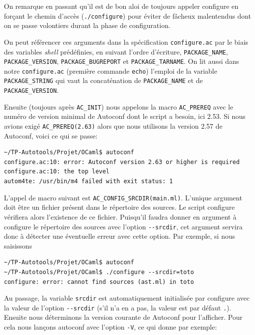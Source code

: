 \documentclass[11pt,a4paper]{article}
\begin{document}
\noindent On remarque en passant qu'il est de bon aloi de toujours
appeler \textsf{configure} en forçant le chemin d'accès
(\texttt{./configure}) pour éviter de fâcheux malentendus dont on se
passe volontiers durant la phase de configuration.

\medskip

\noindent On peut référencer ces arguments dans la spécification
\texttt{configure.ac} par le biais des variables \emph{shell}
prédéfinies, en suivant l'ordre d'écriture, \texttt{PACKAGE\_\-NAME},
\texttt{PACKAGE\_VERSION}, \texttt{PACKAGE\_BUGREPORT} et
\texttt{PACKAGE\_TARNAME}. On lit aussi dans notre
\texttt{configure.ac} (première commande \texttt{echo}) l'emploi de la
variable \texttt{PACKAGE\_STRING} qui vaut la concaténation de
\texttt{PACKAGE\_NAME} et de \texttt{PACKAGE\_\-VERS\-ION}.

\medskip

\noindent Ensuite (toujours après \texttt{AC\_INIT}) nous appelons la
macro \texttt{AC\_PREREQ} avec le numéro de version minimal de
\textsf{Autoconf} dont le script a besoin, ici \textsf{2.53}. Si nous
avions exigé \texttt{AC\_PREREQ(2.63)} alors que nous utilisons la
version \textsf{2.57} de \textsf{Autoconf}, voici ce qui se passe:
{\small
\begin{verbatim}
~/TP-Autotools/Projet/OCaml$ autoconf
configure.ac:10: error: Autoconf version 2.63 or higher is required
configure.ac:10: the top level
autom4te: /usr/bin/m4 failed with exit status: 1
\end{verbatim}
}

\noindent L'appel de macro suivant est
\texttt{AC\_CONFIG\_SRCDIR(main.ml)}. L'unique argument doit être un
fichier présent dans le répertoire des sources. Le script
\textsf{configure} vérifiera alors l'existence de ce
fichier. Puisqu'il faudra donner en argument à \textsf{configure} le
répertoire des sources avec l'option \verb|--srcdir|, cet argument
servira donc à détecter une éventuelle erreur avec cette option. Par
exemple, si nous saisissons

{\small
\begin{verbatim}
~/TP-Autotools/Projet/OCaml$ autoconf
~/TP-Autotools/Projet/OCaml$ ./configure --srcdir=toto
configure: error: cannot find sources (ast.ml) in toto
\end{verbatim}
}

\noindent Au passage, la variable \texttt{srcdir} est automatiquement
initialisée par \textsf{configure} avec la valeur de l'option
\verb|--srcdir| (s'il n'a en a pas, la valeur est par défaut
\texttt{.}). Ensuite nous déterminons la version courante de
\textsf{Autoconf} pour l'afficher. Pour cela nous lançons
\textsf{autoconf} avec l'option \texttt{-V}, ce qui donne par exemple:
\end{document}
